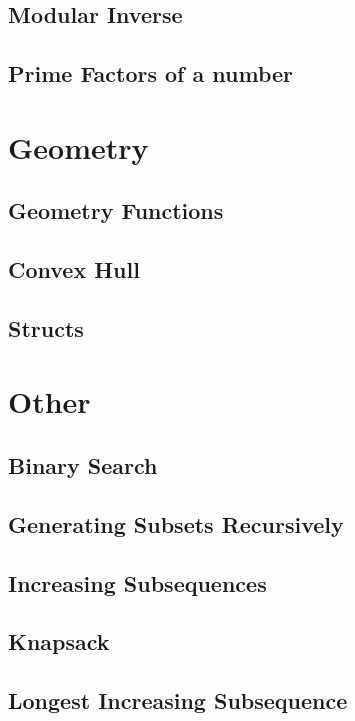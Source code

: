 \documentclass[twocolumn]{article}
\begin{document}
\subsection{Modular Inverse}
\raggedbottom
\hrulefill
\subsection{Prime Factors of a number}
\raggedbottom
\hrulefill

\section{Geometry}
\subsection{Geometry Functions}
\raggedbottom
\hrulefill
\subsection{Convex Hull}
\raggedbottom
\hrulefill
\subsection{Structs}
\raggedbottom
\hrulefill

\section{Other}
\subsection{Binary Search}
\raggedbottom
\hrulefill
\subsection{Generating Subsets Recursively}
\raggedbottom
\hrulefill
\subsection{Increasing Subsequences}
\raggedbottom
\hrulefill
\subsection{Knapsack}
\raggedbottom
\hrulefill
\subsection{Longest Increasing Subsequence}
\raggedbottom
\hrulefill
\end{document}
